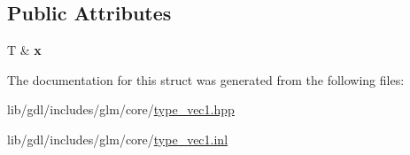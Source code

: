 \subsection*{Public Attributes}
\begin{DoxyCompactItemize}
\item 
\hypertarget{structglm_1_1detail_1_1tref1_a622e46b4e2d963116983cfc13b8c84ed}{}T \& {\bfseries x}\label{structglm_1_1detail_1_1tref1_a622e46b4e2d963116983cfc13b8c84ed}

\end{DoxyCompactItemize}


The documentation for this struct was generated from the following files\+:\begin{DoxyCompactItemize}
\item 
lib/gdl/includes/glm/core/\hyperlink{type__vec1_8hpp}{type\+\_\+vec1.\+hpp}\item 
lib/gdl/includes/glm/core/\hyperlink{type__vec1_8inl}{type\+\_\+vec1.\+inl}\end{DoxyCompactItemize}
